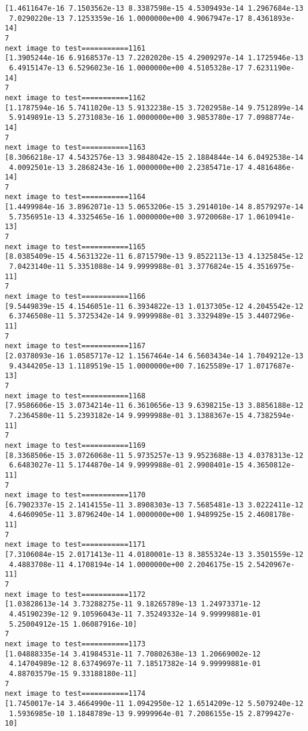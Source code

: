 \documentclass[11pt]{article}
\begin{document}
\begin{Verbatim}[commandchars=\\\{\}]
[1.4611647e-16 7.1503562e-13 8.3387598e-15 4.5309493e-14 1.2967684e-13
 7.0290220e-13 7.1253359e-16 1.0000000e+00 4.9067947e-17 8.4361893e-14]
7
next image to test===========1161
[1.3905244e-16 6.9168537e-13 7.2202020e-15 4.2909297e-14 1.1725946e-13
 6.4915147e-13 6.5296023e-16 1.0000000e+00 4.5105328e-17 7.6231190e-14]
7
next image to test===========1162
[1.1787594e-16 5.7411020e-13 5.9132238e-15 3.7202958e-14 9.7512899e-14
 5.9149891e-13 5.2731083e-16 1.0000000e+00 3.9853780e-17 7.0988774e-14]
7
next image to test===========1163
[8.3066218e-17 4.5432576e-13 3.9848042e-15 2.1884844e-14 6.0492538e-14
 4.0092501e-13 3.2868243e-16 1.0000000e+00 2.2385471e-17 4.4816486e-14]
7
next image to test===========1164
[1.4499984e-16 3.8962071e-13 5.0653206e-15 3.2914010e-14 8.8579297e-14
 5.7356951e-13 4.3325465e-16 1.0000000e+00 3.9720068e-17 1.0610941e-13]
7
next image to test===========1165
[8.0385409e-15 4.5631322e-11 6.8715790e-13 9.8522113e-13 4.1325845e-12
 7.0423140e-11 5.3351088e-14 9.9999988e-01 3.3776824e-15 4.3516975e-11]
7
next image to test===========1166
[9.5449839e-15 4.1546051e-11 6.3934822e-13 1.0137305e-12 4.2045542e-12
 6.3746508e-11 5.3725342e-14 9.9999988e-01 3.3329489e-15 3.4407296e-11]
7
next image to test===========1167
[2.0378093e-16 1.0585717e-12 1.1567464e-14 6.5603434e-14 1.7049212e-13
 9.4344205e-13 1.1189519e-15 1.0000000e+00 7.1625589e-17 1.0717687e-13]
7
next image to test===========1168
[7.9586606e-15 3.0734214e-11 6.3610656e-13 9.6398215e-13 3.8856188e-12
 7.2364580e-11 5.2393182e-14 9.9999988e-01 3.1388367e-15 4.7382594e-11]
7
next image to test===========1169
[8.3368506e-15 3.0726068e-11 5.9735257e-13 9.9523688e-13 4.0378313e-12
 6.6483027e-11 5.1744870e-14 9.9999988e-01 2.9908401e-15 4.3650812e-11]
7
next image to test===========1170
[6.7902337e-15 2.1414155e-11 3.8908303e-13 7.5685481e-13 3.0222411e-12
 4.6460905e-11 3.8796240e-14 1.0000000e+00 1.9489925e-15 2.4608178e-11]
7
next image to test===========1171
[7.3106084e-15 2.0171413e-11 4.0180001e-13 8.3855324e-13 3.3501559e-12
 4.4883708e-11 4.1708194e-14 1.0000000e+00 2.2046175e-15 2.5420967e-11]
7
next image to test===========1172
[1.03828613e-14 3.73288275e-11 9.18265789e-13 1.24973371e-12
 4.45190239e-12 9.10596043e-11 7.35249332e-14 9.99999881e-01
 5.25004912e-15 1.06087916e-10]
7
next image to test===========1173
[1.04888335e-14 3.41984531e-11 7.70802638e-13 1.20669002e-12
 4.14704989e-12 8.63749697e-11 7.18517382e-14 9.99999881e-01
 4.88703579e-15 9.33188180e-11]
7
next image to test===========1174
[1.7450017e-14 3.4664990e-11 1.0942950e-12 1.6514209e-12 5.5079240e-12
 1.5936985e-10 1.1848789e-13 9.9999964e-01 7.2086155e-15 2.8799427e-10]

\end{Verbatim}
\end{document}
